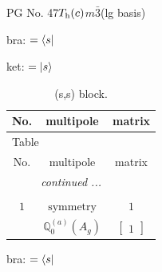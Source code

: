 \documentclass[fleqn,8pt,landscape]{jsarticle}
\begin{document}
\setcounter{MaxMatrixCols}{32}

\renewcommand{\tablename}{Table~}
\renewcommand{\figurename}{Figure~}
\begin{center}
\LARGE
PG No. 47\quad$T_{\rm h}(c)$\quad$m\bar{3}$\quad[ cubic ] (lg basis)
\end{center}
bra: $=\bra{s}$

\noindent
ket: $=\ket{s}$
\renewcommand{\arraystretch}{1.6}
\begin{longtable}{ccc}
\caption{(s,s) block.}
 \\
 \hline \hline
No. & multipole & matrix \\ \hline \endfirsthead

\multicolumn{2}{l}{\tablename\ \thetable{}} \\
 \hline \hline
No. & multipole & matrix \\ \hline \endhead

 \hline \hline
\multicolumn{2}{r}{\footnotesize\it continued ...} \\ \endfoot

 \hline \hline
\multicolumn{2}{r}{} \\ \endlastfoot

$ 1 $ & $ \text{symmetry} $ & $ 1 $ \\
$  $ & $ \mathbb{Q}_{0}^{(a)}(A_{g}) $ & $ \begin{bmatrix} 1 \end{bmatrix} $ \\ \hline
\end{longtable}
bra: $=\bra{s}$
\end{document}

